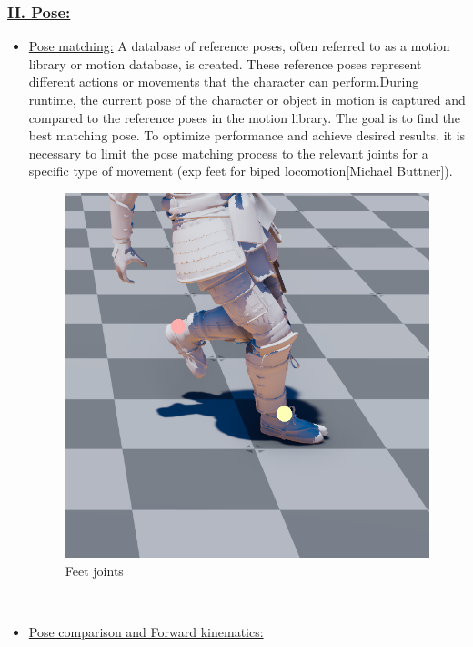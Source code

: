 \documentclass[12pt]{book}
\begin{document}
\subsubsection{\underline{\textbf{II. Pose:}}}
\begin{itemize}
    \item \underline{Pose matching:}
          A database of reference poses, often referred to as a motion library or motion database, is
          created. These reference poses represent different actions or movements that the character can
          perform.During runtime, the current pose of the character or object in motion is captured and compared
          to the reference poses in the motion library. The goal is to find the best matching pose.
          To optimize performance and achieve desired results, it is necessary to limit the pose matching
          process to the relevant joints for a specific type of movement (exp feet for biped locomotion[Michael Buttner]).
          \begin{figure}[!h]
              \centering
              \includegraphics[scale=0.5]{./Figures/Images/feetJoints.png}
              \caption{Feet joints}
              \label{Feet joints}
          \end{figure}\\
    \item \underline{Pose comparison and Forward kinematics:}

\end{itemize}
\end{document}

